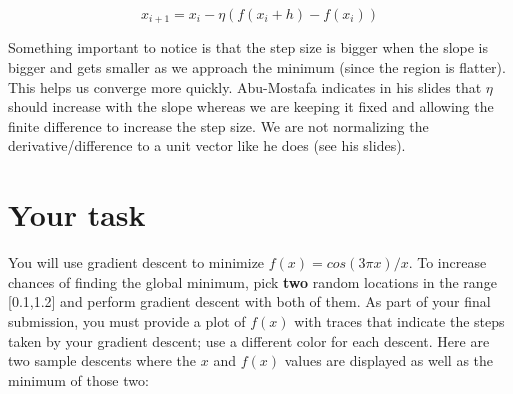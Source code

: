 \begin{fullwidth}
\[
x _{i+1} = x_i - \eta (f(x_{i}+h) - f(x_{i}))
\]

\noindent  Something important to notice is that the step size is bigger when the slope is bigger and gets smaller as we approach the minimum (since the region is flatter). This helps us converge more quickly. Abu-Mostafa indicates in his slides that $\eta$ should increase with the slope whereas we are keeping it fixed and allowing the finite difference to increase the step size. We are not normalizing the derivative/difference to a unit vector like he does (see his slides).

\section{Your task}

You will use gradient descent to minimize $f(x) = cos(3\pi x) / x$. To increase chances of finding the global minimum, pick {\bf two} random locations in the range [0.1,1.2] and perform gradient descent with both of them. As part of your final submission, you must provide a plot of $f(x)$ with traces that indicate the steps taken by your gradient descent; use a different color for each descent. Here are two sample descents where the $x$ and $f(x)$ values are displayed as well as the minimum of those two:


\end{fullwidth}

